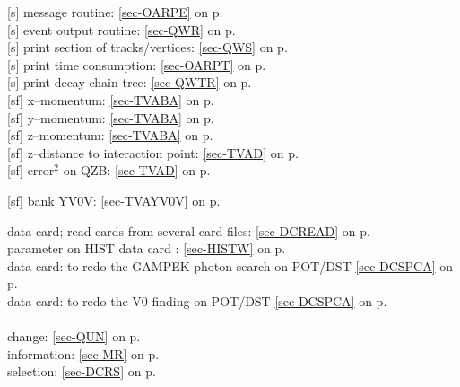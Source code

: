  [s] message routine: \ref{sec-OARPE} on p.~\pageref{sec-OARPE}\\
 [s] event output routine: \ref{sec-QWR} on p.~\pageref{sec-QWR}\\
 [s] print section of tracks/vertices: \ref{sec-QWS} on p.~\pageref{sec-QWS}\\
 [s] print time consumption: \ref{sec-OARPT} on p.~\pageref{sec-OARPT}\\
 [s] print decay chain tree: \ref{sec-QWTR} on p.~\pageref{sec-QWTR}\\
 [sf] x--momentum: \ref{sec-TVABA} on p.~\pageref{sec-TVABA}\\
 [sf] y--momentum: \ref{sec-TVABA} on p.~\pageref{sec-TVABA}\\
 [sf] z--momentum: \ref{sec-TVABA} on p.~\pageref{sec-TVABA}\\
 [sf] z--distance to interaction point: \ref{sec-TVAD} on p.~\pageref{sec-TVAD}\\
 [sf] error$^2$ on QZB: \ref{sec-TVAD} on p.~\pageref{sec-TVAD}
 
 [sf] bank YV0V: \ref{sec-TVAYV0V} on p.~\pageref{sec-TVAYV0V}
 
 data card; read cards from several card
 files: \ref{sec-DCREAD} on p.~\pageref{sec-DCREAD}\\
 parameter on HIST data card : \ref{sec-HISTW} on p.~\pageref{sec-HISTW}\\
 data card: to redo the GAMPEK photon search on POT/DST
 \ref{sec-DCSPCA} on p.~\pageref{sec-DCSPCA}\\
 data card: to redo the V0 finding on POT/DST
 \ref{sec-DCSPCA} on p.~\pageref{sec-DCSPCA}\\
 \\
 \mysubitem change: \ref{sec-QUN} on p.~\pageref{sec-QUN}\\
 \mysubitem information: \ref{sec-MR} on p.~\pageref{sec-MR}\\
 \mysubitem selection: \ref{sec-DCRS} on p.~\pageref{sec-DCRS}
 
